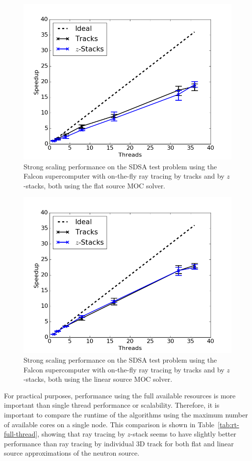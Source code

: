 \begin{figure}[h!]
	\centering
	\includegraphics[width=0.7\linewidth]{figures/results/performance/fs-scaling-comb-stacks-tracks.png}
	\caption[]{Strong scaling performance on the SDSA test problem using the Falcon supercomputer with on-the-fly ray tracing by tracks and by $z$-stacks, both using the flat source \ac{MOC} solver.}
	\label{fig:rt-parallel-fs}
\end{figure}

\begin{figure}[h!]
	\centering
	\includegraphics[width=0.7\linewidth]{figures/results/performance/ls-scaling-comb-stacks-tracks.png}
	\caption[]{Strong scaling performance on the SDSA test problem using the Falcon supercomputer with on-the-fly ray tracing by tracks and by $z$-stacks, both using the linear source \ac{MOC} solver.}
	\label{fig:rt-parallel-ls}
\end{figure}

For practical purposes, performance using the full available resources is more important than single thread performance or scalability. Therefore, it is important to compare the runtime of the algorithms using the maximum number of available cores on a single node. This comparison is shown in Table~\ref{tab:rt-full-thread}, showing that ray tracing by $z$-stack seems to have slightly better performance than ray tracing by individual 3D track for both flat and linear source approximations of the neutron source.

